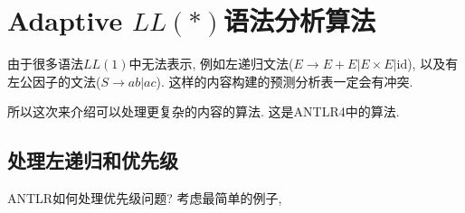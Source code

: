 \documentclass{ctexart}
\begin{document}
\section{Adaptive $LL(*)$语法分析算法}

由于很多语法$LL(1)$中无法表示, 例如左递归文法($E\to E+E | E \times E | \text{id}$), 以及有左公因子的文法($S\to ab | ac$).
这样的内容构建的预测分析表一定会有冲突. 

所以这次来介绍可以处理更复杂的内容的算法. 这是ANTLR4中的算法. 

\subsection{处理左递归和优先级} ANTLR如何处理优先级问题? 考虑最简单的例子, 
\end{document}
